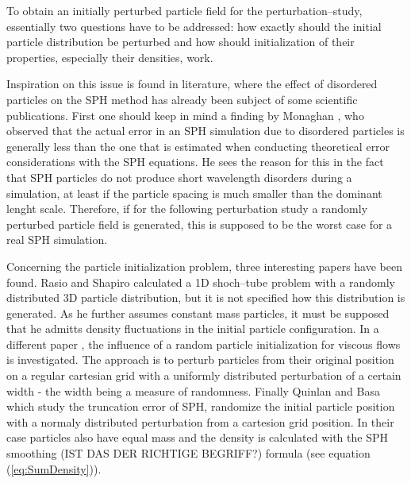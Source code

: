 \documentclass{report}
\begin{document}
 To obtain an initially perturbed particle field for the perturbation--study, essentially two questions have to be addressed: how exactly should the initial particle distribution be perturbed and how should initialization of their properties, especially their densities, work.         
                                                                                                                                              
 Inspiration on this issue is found in literature, where the effect of disordered particles on the SPH method has already been subject of some scientific publications.                                                                                                                      
 First one should keep in mind a finding by Monaghan \cite{Monaghan2005}, who observed that the actual error in an SPH simulation due to disordered particles is generally less than the one that is estimated when conducting theoretical error considerations with the SPH equations. He sees the reason for this in the fact that SPH particles do not produce short wavelength disorders during a simulation, at least if the particle spacing is much smaller than the dominant lenght scale. Therefore, if for the following perturbation study a randomly perturbed particle field is generated, this is supposed to be the worst case for a real SPH simulation.                                                                  
                                                                                                                                              
 Concerning the particle initialization problem, three interesting papers have been found. Rasio and Shapiro \cite{Rassi1991} calculated a 1D shoch--tube problem with a randomly distributed 3D particle distribution, but it is not specified how this distribution is generated. As he further assumes constant mass particles, it must be supposed that he admitts density fluctuations in the initial particle configuration.          
 In a different paper \cite{Graham2007}, the influence of a random particle initialization for viscous flows is investigated. The approach is to perturb particles from their original position on a regular cartesian grid with a uniformly distributed perturbation of a certain width - the width being a measure of randomness.                                                                                                         
 Finally Quinlan and Basa \cite{Quinlan2006} which study the truncation error of SPH, randomize the initial particle position with a normaly distributed perturbation from a cartesion grid position. In their case particles also have equal mass and the density is calculated with the SPH smoothing (IST DAS DER RICHTIGE BEGRIFF?) formula (see equation (\ref{eq:SumDensity})).                                                       
                                                                                                                                              
\end{document}
